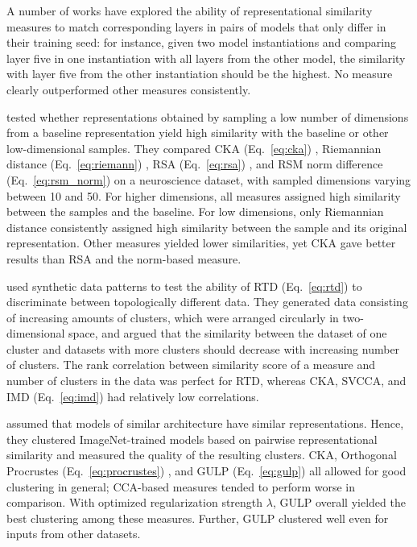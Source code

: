 \documentclass{article}
\newcommand{\citet}{\textcite}
\newcommand\myeqref[1]{%
    (\textup{Eq.~\ref{#1}})%
}
\begin{document}
\begin{refsegment}
\hypertarget{test:layer_match}{}
A number of works \cite{kornblith_similarity_2019,chen_graph-based_2021,shahbazi_using_2021,rahamim_contrasim_2024} have explored the ability of representational similarity measures to match corresponding layers in pairs of models that only differ in their training seed: for instance, given two model instantiations and comparing layer five in one instantiation with all layers from the other model, the similarity with layer five from the other instantiation should be the highest.
No measure clearly outperformed other measures consistently.

\hypertarget{test:dim_subsample}{}
\citet{shahbazi_using_2021} tested whether representations obtained by sampling a low number of dimensions from a baseline representation yield high similarity with the baseline or other low-dimensional samples.
They compared CKA \myeqref{eq:cka}, Riemannian distance \myeqref{eq:riemann}, RSA \myeqref{eq:rsa}, and RSM norm difference \myeqref{eq:rsm_norm} on a neuroscience dataset, with sampled dimensions varying between 10 and 50.
For higher dimensions, all measures assigned high similarity between the samples and the baseline.
For low dimensions, only Riemannian distance consistently assigned high similarity between the sample and its original representation.
Other measures yielded lower similarities, yet CKA gave better results than RSA and the norm-based measure.

\hypertarget{test:cluster_count}{}
\citet{barannikov_representation_2022} used synthetic data patterns to test the ability of RTD \myeqref{eq:rtd} to discriminate between topologically different data.
They generated data consisting of increasing amounts of clusters, which were arranged circularly in two-dimensional space, and argued that the similarity between the dataset of one cluster and datasets with more clusters should decrease with increasing number of clusters.
The rank correlation between similarity score of a measure and number of clusters in the data was perfect for RTD, whereas CKA, SVCCA, and IMD \myeqref{eq:imd} had relatively low correlations.

\hypertarget{test:arch_clustering}{}
\citet{boix-adsera_gulp_2022} assumed that models of similar architecture have similar representations. Hence, they clustered ImageNet-trained models based on pairwise representational similarity and measured the quality of the resulting clusters.
CKA, Orthogonal Procrustes \myeqref{eq:procrustes}, and GULP \myeqref{eq:gulp} all allowed for good clustering in general; CCA-based measures tended to perform worse in comparison.
With optimized regularization strength $\lambda$, GULP overall yielded the best clustering among these measures.
Further, GULP clustered well even for inputs from other datasets.


\end{refsegment}
\end{document}
